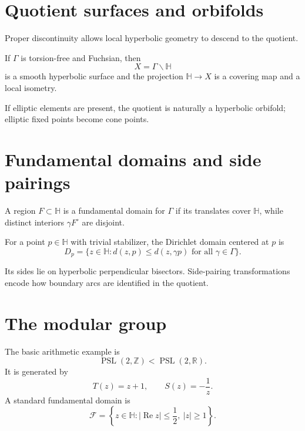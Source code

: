 \section{Quotient surfaces and orbifolds}

Proper discontinuity allows local hyperbolic geometry to descend to the quotient.

\begin{theorem}\label{thm:vii35-quotient}
If \(\Gamma\) is torsion-free and Fuchsian, then
\[
X=\Gamma\backslash\mathbb H
\]
is a smooth hyperbolic surface and the projection \(\mathbb H\to X\) is a covering map and a local isometry.
\end{theorem}

If elliptic elements are present, the quotient is naturally a hyperbolic orbifold; elliptic fixed points become cone points.


\section{Fundamental domains and side pairings}

\begin{definition}\label{def:vii35-fundamental}
A region \(F\subset\mathbb H\) is a fundamental domain for \(\Gamma\) if its translates cover \(\mathbb H\), while distinct interiors \(\gamma F^\circ\) are disjoint.
\end{definition}

\begin{definition}\label{def:vii35-dirichlet}
For a point \(p\in\mathbb H\) with trivial stabilizer, the Dirichlet domain centered at \(p\) is
\[
D_p=\{z\in\mathbb H:d(z,p)\le d(z,\gamma p)\text{ for all }\gamma\in\Gamma\}.
\]
\end{definition}

Its sides lie on hyperbolic perpendicular bisectors.  Side-pairing transformations encode how boundary arcs are identified in the quotient.


\section{The modular group}

The basic arithmetic example is
\[
\operatorname{PSL}(2,\mathbb Z)<\operatorname{PSL}(2,\mathbb R).
\]
It is generated by
\[
T(z)=z+1,
\qquad
S(z)=-\frac1z.
\]
A standard fundamental domain is
\[
\mathcal F=\left\{z\in\mathbb H:|\operatorname{Re}z|\le\frac12,\ |z|\ge1\right\}.
\]

